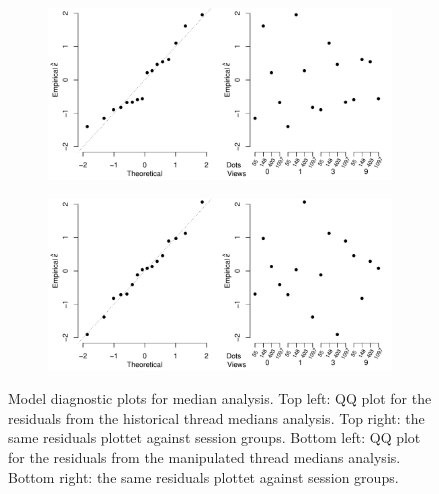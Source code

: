 \documentclass[9pt,a4paper,twocolumn,lineno]{article}
\begin{document}
\begin{figure}%
	\begin{subfigure}[b]{.8\textwidth}
		\includegraphics[width=\textwidth]{med_residual_h.pdf}
	\end{subfigure}
	\begin{subfigure}[b]{.8\textwidth}
		\includegraphics[width=\textwidth]{med_residual_m.pdf}	
	\end{subfigure}
	\caption{Model diagnostic plots for median analysis. Top left: QQ plot for the residuals from the historical thread medians analysis. Top right: the same residuals plottet against session groups. Bottom left: QQ plot for the residuals from the manipulated thread medians analysis. Bottom right: the same residuals plottet against session groups.}
	\label{fig: qq plots median}
\end{figure}
\end{document}
